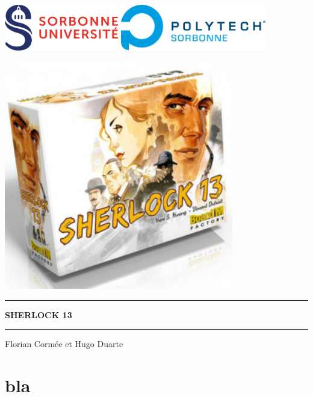 \documentclass[10pt,a4paper]{article}
\newcommand{\titre}{Sherlock 13}
\newcommand{\auteur}{Florian Cormée et Hugo Duarte}
\theoremstyle{ex}
\theoremstyle{break}
\begin{document}
\pagestyle{fancy}
\thispagestyle{empty}

\includegraphics[height=2cm]{logo_sorbonne.png}
\hfill{}
\includegraphics[height=2cm]{logo_polytech.png}
\vfill{}

\begin{center}
	\includegraphics[height=10cm]{sherlock-13.jpg}
\end{center}
\vspace{1cm}

\begin{minipage}[ch]{0.9\textwidth}
	\rule{\linewidth}{0.4pt}
	\vspace{2pt}
	\begin{center}
		\textbf{\LARGE	\MakeUppercase{\titre{}}}
	\end{center}
	\vspace{2pt}
	\rule{\linewidth}{0.4pt}
	\vspace*{1cm}
	\begin{center}
		{\large	\auteur{}}
	\end{center}
\end{minipage}
\vfill{}

\newpage{}
\setcounter{page}{1}

\tableofcontents
\newpage

\section{bla}
\end{document}
